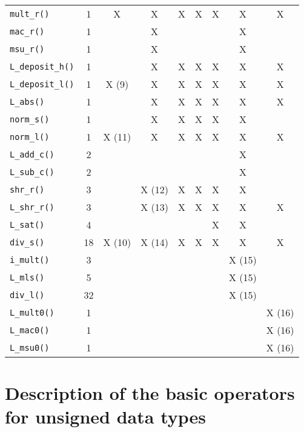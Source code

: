 \begin{table}[th]
\begin{center}
\begin{tabular}{|l|c|c|c|c|c|c|c|c|}
            {\tt mult\_r()} &1 &X &X &X &X &X &X &X\\
            {\tt mac\_r()}  &1 & &X & & & &X & \\
            {\tt msu\_r()}  &1 & &X & & & &X & \\
            {\tt L\_deposit\_h()}   &1 & &X &X &X &X &X &X\\
            {\tt L\_deposit\_l()}   &1 &X (9) &X &X &X &X &X &X\\
            {\tt L\_abs()}  &1 & &X &X &X &X &X &X\\
            {\tt norm\_s()}         &1 & &X &X &X &X &X & \\
            {\tt norm\_l()} &1 &X (11) &X &X &X &X &X &X\\
            {\tt L\_add\_c()}       &2 & & & & & &X & \\
            {\tt L\_sub\_c()}       &2 & & & & & &X & \\
            {\tt shr\_r()}  &3 & &X (12) &X &X &X &X & \\
            {\tt L\_shr\_r()}       &3 & &X (13) &X &X &X &X &X\\
            {\tt L\_sat()}  &4 & & & & &X &X &\\
            {\tt div\_s()}  &18 &X (10) &X (14) &X &X &X &X &X\\
            \hline
            {\tt i\_mult()} &3 & & & & & &X (15) & \\
            {\tt L\_mls()}  &5 & & & & & &X (15) & \\
            {\tt div\_l()}  &32 & & & & & &X (15) & \\
            \hline
            {\tt L\_mult0()} &1 & & & & & & &X (16)\\
            {\tt L\_mac0()}  &1 & & & & & & &X (16)\\
            {\tt L\_msu0()}  &1 & & & & & & &X (16)\\
            \hline
        \end{tabular}
    \end{center}
\end{table}

\flushfloats

\section{Description of the basic operators for unsigned data types}

